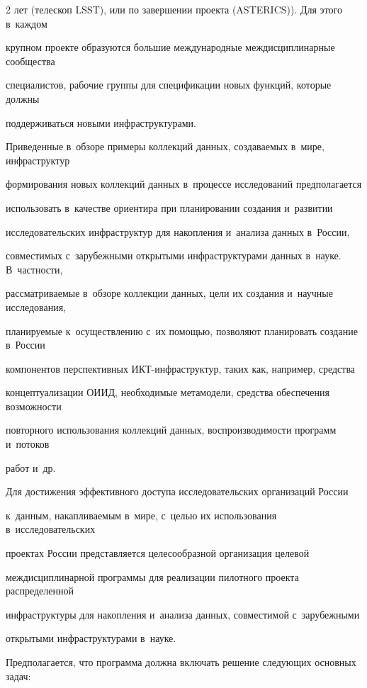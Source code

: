 \begin{multicols}{2}
лет (телескоп LSST), или по завершении проекта (ASTERICS)). Для этого в~каждом 


крупном проекте образуются большие международные междисциплинарные сообщества 


специалистов, рабочие группы для спецификации новых функций, которые должны 


поддерживаться новыми инфраструктурами.


  


  Приведенные в~обзоре примеры коллекций данных, создаваемых в~мире, инфраструктур 


формирования новых коллекций данных в~процессе исследований предполагается 


использовать в~качестве ориентира при планировании создания и~развитии 


исследовательских инфраструктур для накопления и~анализа данных в~России, 


совместимых с~зарубежными открытыми инфраструктурами данных в~науке. В~частности, 


рассматриваемые в~обзоре коллекции данных, цели их создания и~научные исследования, 


планируемые к~осуществлению с~их помощью, позволяют планировать создание в~России 


компонентов перспективных ИКТ-инфра\-струк\-тур, таких как, например, средства 


концептуализации ОИИД, необходимые метамодели, средства обеспечения возможности 


повторного использования коллекций данных, воспроизводимости программ и~потоков 


работ и~др.


  


  Для достижения эффективного доступа исследовательских организаций России 


к~данным, накапливаемым в~мире, с~целью их использования в~исследовательских 


проектах России представляется целесообразной организация целевой 


междисциплинарной программы для реализации пилотного проекта распределенной 


инфраструктуры для накопления и~анализа данных, совместимой с~зарубежными 


открытыми инфраструктурами в~науке.




  Предполагается, что программа должна включать решение следующих основных задач: 



\end{multicols}
